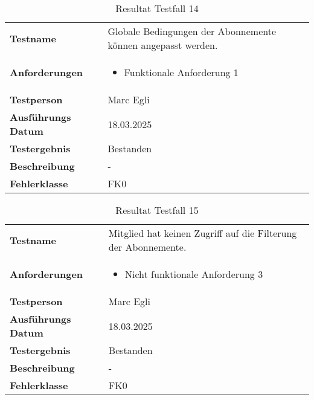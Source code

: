 \begin{table}[H]
    \begin{tabular}{|L{0.3\textwidth}|L{0.65\textwidth}|}
        \hline
           \\[10pt]
        \hline
        \textbf{Testname} & Globale Bedingungen der Abonnemente können angepasst werden. \\
        \hline
        \textbf{Anforderungen} & 
        \begin{itemize}
            \item Funktionale Anforderung 1
        \end{itemize} \\
        \hline
        \textbf{Testperson} & Marc Egli \\
        \hline
        \textbf{Ausführungs Datum} & 18.03.2025 \\
        \hline
        \textbf{Testergebnis} & Bestanden \\
        \hline
        \textbf{Beschreibung} & - \\ 
        \hline
        \textbf{Fehlerklasse} & FK0 \\ 
        \hline
    \end{tabular}
    \caption{Resultat Testfall 14}
\end{table}

\begin{table}[H]
    \begin{tabular}{|L{0.3\textwidth}|L{0.65\textwidth}|}
        \hline
           \\[10pt]
        \hline
        \textbf{Testname} & Mitglied hat keinen Zugriff auf die Filterung der Abonnemente. \\
        \hline
        \textbf{Anforderungen} & 
        \begin{itemize}
            \item Nicht funktionale Anforderung 3
        \end{itemize} \\
        \hline
        \textbf{Testperson} & Marc Egli \\
        \hline
        \textbf{Ausführungs Datum} & 18.03.2025 \\
        \hline
        \textbf{Testergebnis} & Bestanden \\
        \hline
        \textbf{Beschreibung} & - \\ 
        \hline
        \textbf{Fehlerklasse} & FK0 \\ 
        \hline
    \end{tabular}
    \caption{Resultat Testfall 15}
\end{table}

